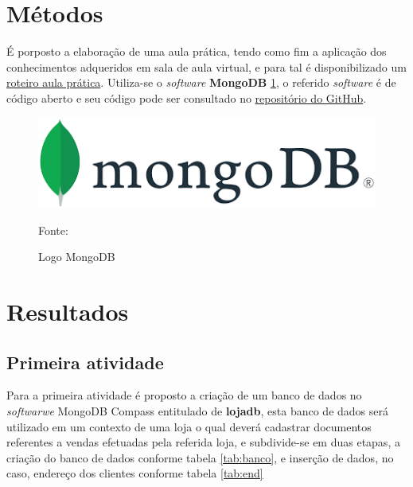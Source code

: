 \section{Métodos}

\par É porposto a elaboração de uma aula prática, tendo como fim a aplicação dos conhecimentos adqueridos em sala de aula virtual, e para tal é disponibilizado um \href{https://github.com/ENGENHARIA-DE-SOFTWARE-UNOPAR/NoSQL/blob/main/Roteiro-aula%20pratica.pdf}{roteiro aula prática}. Utiliza-se o \textit{software} \textbf{MongoDB} \ref{fig:logodb}, o referido \textit{software} é de código aberto e seu código pode ser consultado no \href{https://github.com/mongodb}{repositório do GitHub}.

\begin{figure}[H]
  \caption{Logo MongoDB}
  \includegraphics[scale=0.8]{figure/mongologo.png}
  \label{fig:logodb}

  {\fontsize{10pt}{\baselineskip}\selectfont
    Fonte: }
\end{figure}




\section{Resultados}
\subsection{Primeira atividade}\label{1atividade}
\par Para a primeira atividade é proposto a criação de um banco de dados no \textit{softwarwe} MongoDB Compass entitulado de \textbf{lojadb}, esta banco de dados será utilizado em um contexto de uma loja o qual deverá cadastrar documentos referentes a vendas efetuadas pela referida loja, e subdivide-se em duas etapas, a criação do banco de dados conforme tabela \ref{tab:banco}, e inserção de dados, no caso, endereço dos clientes conforme tabela \ref{tab:end}

